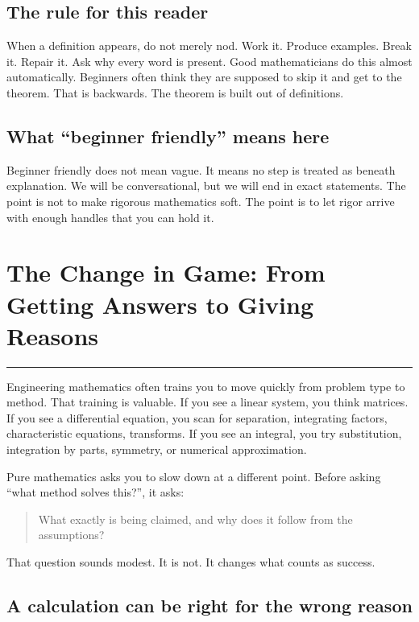 \documentclass[12pt]{article}
\newcommand{\chapterline}{\vspace{0.4em}\hrule\vspace{0.8em}}
\begin{document}
\subsection*{The rule for this reader}

When a definition appears, do not merely nod. Work it. Produce examples. Break it. Repair it. Ask why every word is present. Good mathematicians do this almost automatically. Beginners often think they are supposed to skip it and get to the theorem. That is backwards. The theorem is built out of definitions.

\subsection*{What ``beginner friendly'' means here}

Beginner friendly does not mean vague. It means no step is treated as beneath explanation. We will be conversational, but we will end in exact statements. The point is not to make rigorous mathematics soft. The point is to let rigor arrive with enough handles that you can hold it.

\newpage
\section{The Change in Game: From Getting Answers to Giving Reasons}
\chapterline

Engineering mathematics often trains you to move quickly from problem type to method. That training is valuable. If you see a linear system, you think matrices. If you see a differential equation, you scan for separation, integrating factors, characteristic equations, transforms. If you see an integral, you try substitution, integration by parts, symmetry, or numerical approximation.

Pure mathematics asks you to slow down at a different point. Before asking ``what method solves this?'', it asks:

\begin{quote}
What exactly is being claimed, and why does it follow from the assumptions?
\end{quote}

That question sounds modest. It is not. It changes what counts as success.

\subsection{A calculation can be right for the wrong reason}
\end{document}
